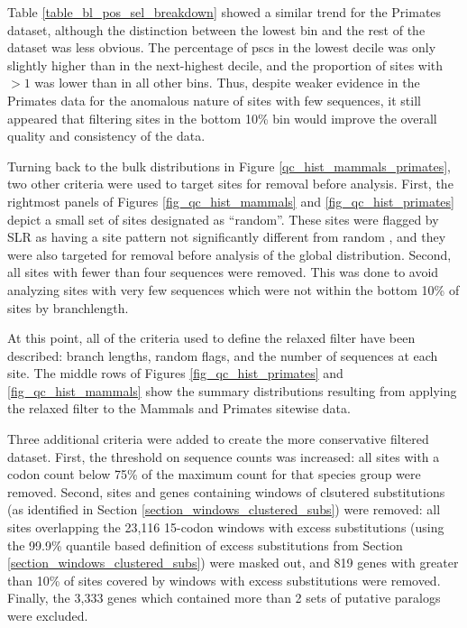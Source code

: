 Table \ref{table_bl_pos_sel_breakdown} showed a similar trend for the
Primates dataset, although the distinction between the lowest bin and
the rest of the dataset was less obvious. The percentage of \acp{psc}
in the lowest decile was only slightly higher than in the next-highest
decile, and the proportion of sites with \omgml$>1$ was lower than in
all other bins. Thus, despite weaker evidence in the Primates data for
the anomalous nature of sites with few \ngap sequences, it still
appeared that filtering sites in the bottom 10\% bin would improve the
overall quality and consistency of the data.

Turning back to the bulk distributions in Figure
\ref{qc_hist_mammals_primates}, two other criteria were used to target
sites for removal before analysis. First, the rightmost panels of
Figures \ref{fig_qc_hist_mammals} and \ref{fig_qc_hist_primates}
depict a small set of sites designated as ``random''. These sites were
flagged by SLR as having a site pattern not significantly different
from random \citep{Massingham2005}, and they were also targeted for
removal before analysis of the global distribution. Second, all sites
with fewer than four \ngap sequences were removed. This was done to
avoid analyzing sites with very few sequences which were not within
the bottom 10\% of sites by \ngap branchlength.

At this point, all of the criteria used to define the relaxed filter
have been described: \ngap branch lengths, random flags, and the
number of \ngap sequences at each site.
The middle rows of Figures \ref{fig_qc_hist_primates} and
\ref{fig_qc_hist_mammals} show the summary distributions resulting
from applying the relaxed filter to the Mammals and Primates sitewise
data.

Three additional criteria were added to create the more conservative
filtered dataset. First, the threshold on \ngap sequence counts was
increased: all sites with a \ngap codon count below 75\% of the
maximum \ngap count for that species group were removed. Second, sites
and genes containing windows of clsutered \nsyn substitutions (as
identified in Section \ref{section_windows_clustered_subs}) were
removed: all sites overlapping the 23,116 15-codon windows with excess
\nsyn substitutions (using the 99.9\% quantile based definition of
excess substitutions from Section
\ref{section_windows_clustered_subs}) were masked out, and 819 genes
with greater than 10\% of sites covered by windows with excess \nsyn
substitutions were removed. Finally, the 3,333 genes which contained
more than 2 sets of putative paralogs were excluded.

